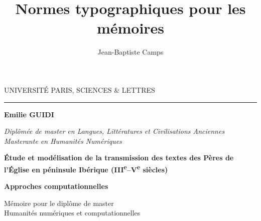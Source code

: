 \documentclass[a4paper,twoside,12pt]{book}
\title{Normes typographiques pour les mémoires}
\author{Jean-Baptiste Camps}
\begin{document}

\frontmatter

\begin{titlepage}
\begin{center}

\bigskip

\begin{large}
UNIVERSITÉ PARIS, SCIENCES \& LETTRES
\end{large}
\begin{center}\rule{2cm}{0.02cm}\end{center}

\bigskip
\bigskip
\bigskip
\begin{Large}
\textbf{Emilie GUIDI}\\
\end{Large}
\begin{normalsize} \textit{Diplômée de master en Langues, Littératures et Civilisations Anciennes}\\
\textit{Masterante en Humanités Numériques}\\

\end{normalsize}

\bigskip
\bigskip
\bigskip

\begin{Huge}
\textbf{Étude et modélisation de la transmission des textes des Pères de l’Église en péninsule Ibérique (III\textsuperscript{e}–V\textsuperscript{e} siècles)
}\\
\end{Huge}
\bigskip
\bigskip
\begin{LARGE}
\textbf{Approches computationnelles}\\
\end{LARGE}

\bigskip
\bigskip
\bigskip
\begin{large}
\end{large}
\vfill

\begin{large}
Mémoire 
pour le diplôme de master\\
\og Humanités numériques et computationnelles \fg{} \\
\end{large}

\end{center}
\end{titlepage}

\thispagestyle{empty}
\end{document}
